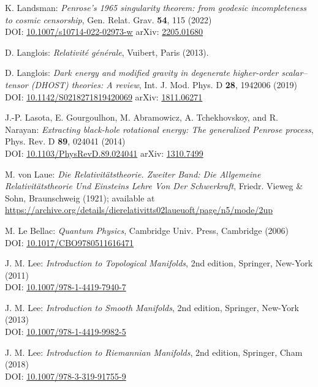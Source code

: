 \begin{thebibliography}{123}
K. Landsman:
{\em Penrose's 1965 singularity theorem: from geodesic incompleteness to cosmic censorship},
Gen. Relat. Grav. {\bf 54}, 115 (2022)\\
DOI: \href{https://doi.org/10.1007/s10714-022-02973-w}{10.1007/s10714-022-02973-w}\hfill
arXiv: \href{https://arxiv.org/abs/2205.01680}{2205.01680}

D. Langlois:
{\em Relativité générale},
Vuibert, Paris (2013).

D. Langlois:
{\em Dark energy and modified gravity in degenerate higher-order scalar–tensor (DHOST) theories: A review},
Int. J. Mod. Phys. D {\bf 28}, 1942006 (2019)\\
DOI: \href{https://doi.org/10.1142/S0218271819420069}{10.1142/S0218271819420069}\hfill
arXiv: \href{https://arxiv.org/abs/1811.06271}{1811.06271}

J.-P. Lasota, E. Gourgoulhon, M. Abramowicz, A. Tchekhovskoy,
and R. Narayan:
{\em Extracting black-hole rotational energy: The generalized Penrose process},
Phys. Rev. D {\bf 89}, 024041 (2014)  \\
DOI: \href{https://doi.org/10.1103/PhysRevD.89.024041}{10.1103/PhysRevD.89.024041}\hfill
arXiv: \href{https://arxiv.org/abs/1310.7499}{1310.7499}

M. von Laue: {\em Die Relativitätstheorie. Zweiter Band: Die Allgemeine Relativitätstheorie Und Einsteins Lehre Von Der Schwerkraft},
Friedr. Vieweg \& Sohn, Braunschweig (1921); available at \\
\url{https://archive.org/details/dierelativitts02laueuoft/page/n5/mode/2up}

M. Le Bellac:
{\em Quantum Physics},
Cambridge Univ. Press, Cambridge (2006)\\
DOI: \href{https://doi.org/10.1017/CBO9780511616471}{10.1017/CBO9780511616471}

J. M. Lee: {\em Introduction to Topological Manifolds}, 2nd edition,
Springer, New-York (2011)\\
DOI: \href{https://doi.org/10.1007/978-1-4419-7940-7}{10.1007/978-1-4419-7940-7}

J. M. Lee: {\em Introduction to Smooth Manifolds}, 2nd edition,
Springer, New-York (2013)\\
DOI: \href{https://doi.org/10.1007/978-1-4419-9982-5}{10.1007/978-1-4419-9982-5}

J. M. Lee: {\em Introduction to Riemannian Manifolds}, 2nd edition,
Springer, Cham (2018)\\
DOI: \href{https://doi.org/10.1007/978-3-319-91755-9}{10.1007/978-3-319-91755-9}


\end{thebibliography}
